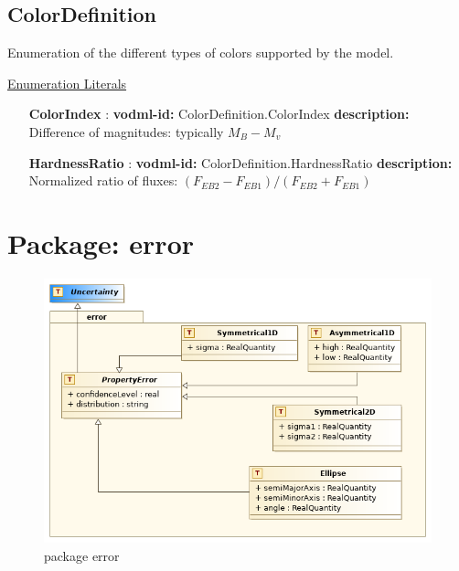   \subsection{ColorDefinition}
  \label{sect:ColorDefinition}

  Enumeration of the different types of colors supported by the model.

  \noindent \underline{Enumeration Literals}
  \vspace{-\parsep}
  \small
  \begin{itemize}
  
    \item[\textbf{ColorIndex}]: \textbf{vodml-id:} ColorDefinition.ColorIndex \newline
          \textbf{description:} Difference of magnitudes: typically $M_B - M_v$
    \item[\textbf{HardnessRatio}]: \textbf{vodml-id:} ColorDefinition.HardnessRatio \newline
          \textbf{description:} Normalized ratio of fluxes: $(F_{EB2} - F_{EB1}) / (F_{EB2} + F_{EB1})$
  \end{itemize}
  \normalsize


\pagebreak
\section{Package: error }
  \begin{figure}[h]
    \includegraphics[width=1.0\textwidth]{../model/error.png}
    \caption{package error}
    \label{fig:error}
  \end{figure}




